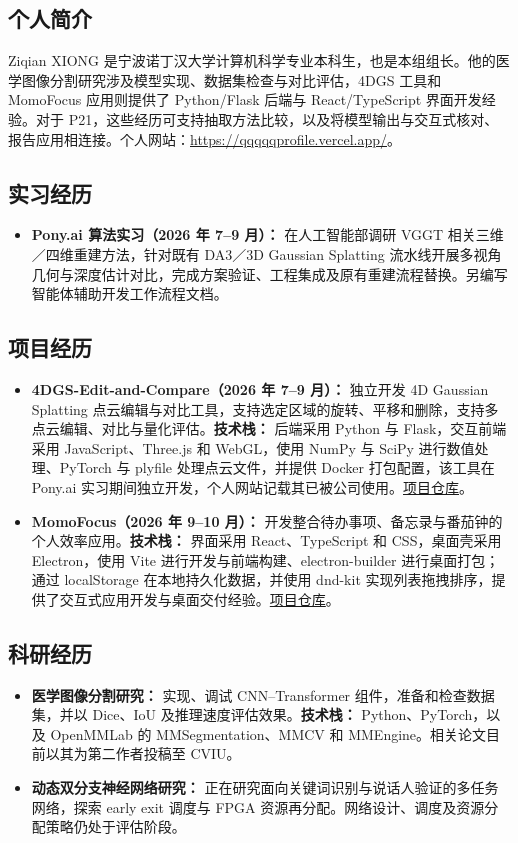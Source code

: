 \documentclass[a4paper,12pt]{article}
\begin{document}
\subsection*{个人简介}
Ziqian XIONG 是宁波诺丁汉大学计算机科学专业本科生，也是本组组长。他的医学图像分割研究涉及模型实现、数据集检查与对比评估，4DGS 工具和 MomoFocus 应用则提供了 Python/Flask 后端与 React/TypeScript 界面开发经验。对于 P21，这些经历可支持抽取方法比较，以及将模型输出与交互式核对、报告应用相连接。个人网站：\url{https://qqqqqprofile.vercel.app/}。

\subsection*{实习经历}
\begin{itemize}
  \item \textbf{Pony.ai 算法实习（2026 年 7--9 月）：} 在人工智能部调研 VGGT 相关三维／四维重建方法，针对既有 DA3／3D Gaussian Splatting 流水线开展多视角几何与深度估计对比，完成方案验证、工程集成及原有重建流程替换。另编写智能体辅助开发工作流程文档。
\end{itemize}

\subsection*{项目经历}
\begin{itemize}
  \item \textbf{4DGS-Edit-and-Compare（2026 年 7--9 月）：} 独立开发 4D Gaussian Splatting 点云编辑与对比工具，支持选定区域的旋转、平移和删除，支持多点云编辑、对比与量化评估。\textbf{技术栈：} 后端采用 Python 与 Flask，交互前端采用 JavaScript、Three.js 和 WebGL，使用 NumPy 与 SciPy 进行数值处理、PyTorch 与 plyfile 处理点云文件，并提供 Docker 打包配置，该工具在 Pony.ai 实习期间独立开发，个人网站记载其已被公司使用。\href{https://github.com/qianqqqqqXZQ/4DGS-Edit-and-Compare}{项目仓库}。
  \item \textbf{MomoFocus（2026 年 9--10 月）：} 开发整合待办事项、备忘录与番茄钟的个人效率应用。\textbf{技术栈：} 界面采用 React、TypeScript 和 CSS，桌面壳采用 Electron，使用 Vite 进行开发与前端构建、electron-builder 进行桌面打包；通过 localStorage 在本地持久化数据，并使用 dnd-kit 实现列表拖拽排序，提供了交互式应用开发与桌面交付经验。\href{https://github.com/qianqqqqqXZQ/MomoFocus}{项目仓库}。
\end{itemize}

\subsection*{科研经历}
\begin{itemize}
  \item \textbf{医学图像分割研究：} 实现、调试 CNN--Transformer 组件，准备和检查数据集，并以 Dice、IoU 及推理速度评估效果。\textbf{技术栈：} Python、PyTorch，以及 OpenMMLab 的 MMSegmentation、MMCV 和 MMEngine。相关论文目前以其为第二作者投稿至 CVIU。
  \item \textbf{动态双分支神经网络研究：} 正在研究面向关键词识别与说话人验证的多任务网络，探索 early exit 调度与 FPGA 资源再分配。网络设计、调度及资源分配策略仍处于评估阶段。
\end{itemize}
\end{document}
